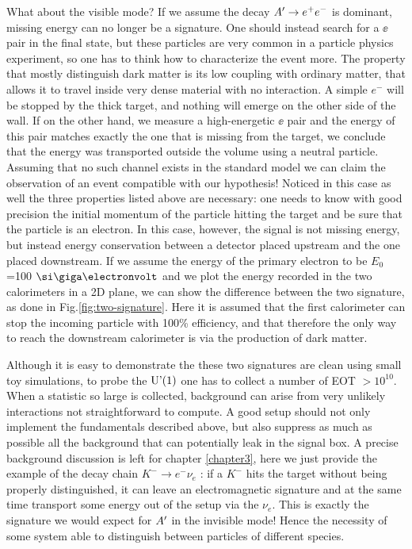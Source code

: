 What about the visible mode? If we assume the decay $A' \to e^+e^-$ is dominant, missing energy can no longer be a signature. One should instead search for a $\ee$ pair in the final state, but these particles are very common in a particle physics experiment, so one has to think how to characterize the event more. The property that mostly distinguish dark matter is its low coupling with ordinary matter, that allows it to travel inside very dense material with no interaction. A simple $e^-$ will be stopped by the thick target, and nothing will emerge on the other side of the wall. If on the other hand, we measure a high-energetic $\ee$ pair and the energy of this pair matches exactly the one that is missing from the target, we conclude that the energy was transported outside the volume using a neutral particle. Assuming that no such channel exists in the standard model we can claim the observation of an event compatible with our hypothesis! Noticed in this case as well the three properties listed above are necessary: one needs to know with good precision the initial momentum of the particle hitting the target and be sure that the particle is an electron. In this case, however, the signal is not missing energy, but instead energy conservation between a detector placed upstream and the one placed downstream.
If we assume the energy of the primary electron to be $E_0$=100 $\gev$ and we plot the energy recorded in the two calorimeters in a 2D plane, we can show the difference between the two signature, as done in Fig.\ref{fig:two-signature}. Here it is assumed that the first calorimeter can stop the incoming particle with 100\% efficiency, and that therefore the only way to reach the downstream calorimeter is via the production of dark matter.

Although it is easy to demonstrate the these two signatures are clean using small toy simulations, to probe the $\textrm{U'(1)}$ one has to collect a number of EOT $>10^{10}$. When a statistic so large is collected, background can arise from very unlikely interactions not straightforward to compute. A good setup should not only implement the fundamentals described above, but also suppress as much as possible all the background that can potentially leak in the signal box. A precise background discussion is left for chapter \ref{chapter3}, here we just provide the example of the decay chain $K^- \to e^- \nu_e$ \cite{review-particle-physics}: if a $K^-$ hits the target without being properly distinguished, it can leave an electromagnetic signature and at the same time transport some energy out of the setup via the $\nu_e$. This is exactly the signature we would expect for $A'$ in the invisible mode! Hence the necessity of some system able to distinguish between particles of different species.

